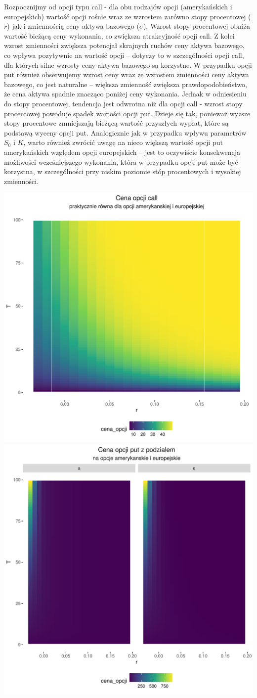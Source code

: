 \documentclass[
]{article}
\begin{document}
Rozpocznijmy od opcji typu call - dla obu rodzajów opcji (amerykańskich
i europejskich) wartość opcji rośnie wraz ze wzrostem zarówno stopy
procentowej (\(r\)) jak i zmiennością ceny aktywa bazowego (\(\sigma\)).
Wzrost stopy procentowej obniża wartość bieżącą ceny wykonania, co
zwiększa atrakcyjność opcji call. Z kolei wzrost zmienności zwiększa
potencjał skrajnych ruchów ceny aktywa bazowego, co wpływa pozytywnie na
wartość opcji -- dotyczy to w szczególności opcji call, dla których
silne wzrosty ceny aktywa bazowego są korzystne. W przypadku opcji put
również obserwujemy wzrost ceny wraz ze wzrostem zmienności ceny aktywa
bazowego, co jest naturalne -- większa zmienność zwiększa
prawdopodobieństwo, że cena aktywa spadnie znacząco poniżej ceny
wykonania. Jednak w odniesieniu do stopy procentowej, tendencja jest
odwrotna niż dla opcji call - wzrost stopy procentowej powoduje spadek
wartości opcji put. Dzieje się tak, ponieważ wyższe stopy procentowe
zmniejszają bieżącą wartość przyszłych wypłat, które są podstawą wyceny
opcji put. Analogicznie jak w przypadku wpływu parametrów \(S_0\) i
\(K\), warto również zwrócić uwagę na nieco większą wartość opcji put
amerykańskich względem opcji europejskich -- jest to oczywiście
konsekwencja możliwości wcześniejszego wykonania, która w przypadku
opcji put może być korzystna, w szczególności przy niskim poziomie stóp
procentowych i wysokiej zmienności.

\begin{center}\includegraphics[width=0.45\linewidth]{wykresy/c_r_r_r_T} \includegraphics[width=0.45\linewidth]{wykresy/p_r_r_r_T} \end{center}
\end{document}
